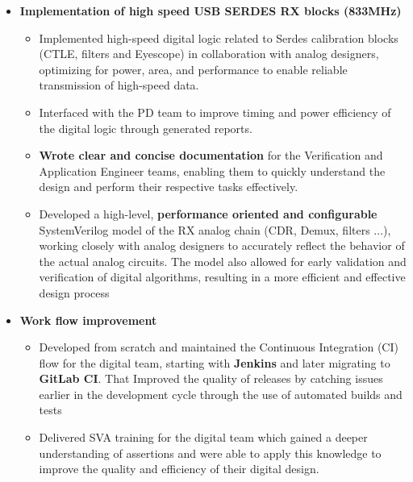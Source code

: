 \begin{cventries}
{\begin{cvitems}
\begin{itemize}
\begin{itemize}
            \item {\textbf{Setup and configured the C toolchain} in the simulation environment, enabling efficient and accurate testing and validation of designs.}
            \item {Effectively interfaced with external Design Verification (DV) contractors to ensure seamless integration of their deliverables into the project, resulting in successful project completion.}
          \end{itemize}
          \item {\textbf{Implementation of high speed USB SERDES RX blocks (833MHz)}}
          \begin{itemize}
            \item {Implemented high-speed digital logic related to Serdes calibration blocks (CTLE, filters and Eyescope) in collaboration with analog designers, optimizing for power, area, and performance to enable reliable transmission of high-speed data.}
            \item {Interfaced with the PD team to improve timing and power efficiency of the digital logic through generated reports.}
            \item {\textbf{Wrote clear and concise documentation} for the Verification and Application Engineer teams, enabling them to quickly understand the design and perform their respective tasks effectively.}
            \item {Developed a high-level, \textbf{performance oriented and configurable} SystemVerilog model of the RX analog chain (CDR, Demux, filters ...), working closely with analog designers to accurately reflect the behavior of the actual analog circuits. The model also allowed for early validation and verification of digital algorithms, resulting in a more efficient and effective design process}
          \end{itemize}
          \item {\textbf{Work flow improvement}}
          \begin{itemize}
            \item {Developed from scratch and maintained the Continuous Integration (CI) flow for the digital team, starting with \textbf{Jenkins} and later migrating to \textbf{GitLab CI}. That Improved the quality of releases by catching issues earlier in the development cycle through the use of automated builds and tests}
            \item {Delivered SVA training for the digital team which gained a deeper understanding of assertions and were able to apply this knowledge to improve the quality and efficiency of their digital design.}

\end{itemize}
\end{itemize}
\end{cvitems}}
\end{cventries}
